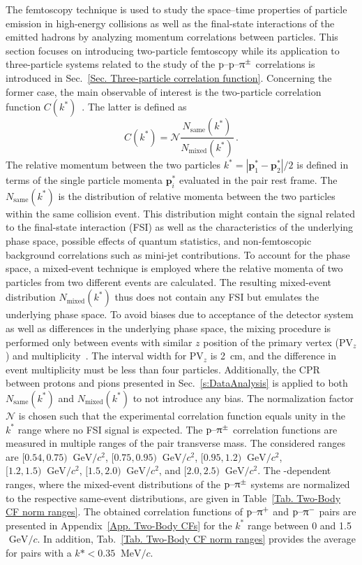 \documentclass[ALICE,manyauthors]{cernphprep}
\begin{document}
 The femtoscopy technique is used to study the space--time properties of particle emission in high-energy collisions as well as the final-state interactions of the emitted hadrons by analyzing momentum correlations between particles. This section focuses on introducing two-particle femtoscopy while its application to three-particle systems related to the study of the $\text{p--p--}\uppi^\pm$ correlations is introduced in Sec.~\ref{Sec. Three-particle correlation function}. Concerning the former case, the main observable of interest is the two-particle correlation function $C(k^*)$~\cite{Lisa:2005dd, Fabbietti:2020bfg}. The latter is defined as
  \begin{equation}
     C(k^*) = \mathcal{N} \frac{N_{\text{same}}(k^*)}{N_{\text{mixed}}(k^*)} \,. \label{Eq. CF}
 \end{equation}
 The relative momentum between the two particles $k^* = |\mathbf{p}_1^*-\mathbf{p}_2^*|/2$ is defined in terms of the single particle momenta $\mathbf{p}_{i}^*$ evaluated in the pair rest frame. The $N_{\text{same}}(k^*)$ is the distribution of relative momenta between the two particles within the same collision event. This distribution might contain the signal related to the final-state interaction (FSI) as well as the characteristics of the underlying phase space, possible effects of quantum statistics, and non-femtoscopic background correlations such as mini-jet contributions. To account for the phase space, a mixed-event technique is employed where the relative momenta of two particles from two different events are calculated. The resulting mixed-event distribution $N_{\text{mixed}}(k^*)$ thus does not contain any FSI but emulates the underlying phase space. To avoid biases due to acceptance of the detector system as well as differences in the underlying phase space, the mixing procedure is performed only between events with similar $z$ position of the primary vertex ($\text{PV}_z$) and multiplicity~\cite{ppSourceErratum}. The interval width for $\text{PV}_z$ is 2~cm, and the difference in event multiplicity must be less than four particles. Additionally, the CPR between protons and pions presented in Sec.~\ref{s:DataAnalysis} is applied to both $N_{\text{same}}(k^*)$ and $N_{\text{mixed}}(k^*)$ to not introduce any bias. The normalization factor $\mathcal{N}$ is chosen such that the experimental correlation function equals unity in the $k^*$ range where no FSI signal is expected. The $\text{p--}\uppi^\pm$ correlation functions are measured in multiple ranges of the pair transverse mass. The considered \mtText{} ranges are $[0.54, 0.75)~\text{ GeV}/c^2$, $[0.75, 0.95)~\text{ GeV}/c^2$, $[0.95, 1.2)~\text{ GeV}/c^2$, $[1.2, 1.5)~\text{ GeV}/c^2$, $[1.5, 2.0)~\text{ GeV}/c^2$, and $[2.0, 2.5)~\text{ GeV}/c^2$. The \mtText-dependent ranges, where the mixed-event distributions of the $\text{p--}\uppi^\pm$ systems are normalized to the respective same-event distributions, are given in Table~\ref{Tab. Two-Body CF norm ranges}. The obtained correlation functions of $\text{p--}\uppi^+$ and $\text{p--}\uppi^-$ pairs are presented in Appendix~\ref{App. Two-Body CFs} for the $k^*$ range between 0 and 1.5~$\text{ GeV}/c$. In addition, Tab.~\ref{Tab. Two-Body CF norm ranges} provides the average \mtText{} for pairs with a $k*<0.35~\text{ MeV}/c$.
\end{document}
